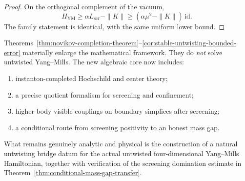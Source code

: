 \begin{proof}
On the orthogonal complement of the vacuum,
\[
H_{\mathrm{YM}}\ge \alpha L_{\mathrm{scr}}-\|K\| \ge (\alpha\mu^2-\|K\|)\,\mathrm{id}.
\]
The family statement is identical, with the same uniform lower bound.
\end{proof}

\begin{remark}
\label{rem:what-is-proved-what-remains-inst}
Theorems~\ref{thm:novikov-completion-theorem}--\ref{cor:stable-untwisting-bounded-error} materially enlarge the
mathematical framework.
They do \emph{not} solve untwisted Yang--Mills.  The new algebraic core now includes:
\begin{enumerate}[label=(\roman*)]
\item instanton-completed Hochschild and center theory;
\item a precise quotient formalism for screening and confinement;
\item higher-body visible couplings on boundary simplices after screening;
\item a conditional route from screening positivity to an honest mass gap.
\end{enumerate}
What remains genuinely analytic and physical is the construction of a natural untwisting bridge datum
for the actual untwisted four-dimensional Yang--Mills Hamiltonian, together with verification of the
screening domination estimate in Theorem~\ref{thm:conditional-mass-gap-transfer}.
\end{remark}
